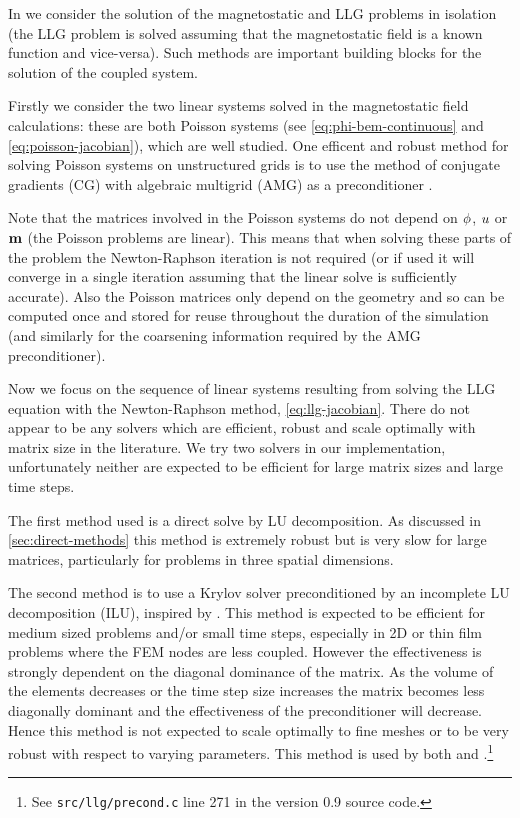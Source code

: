 In  we consider the solution of the magnetostatic and LLG problems in isolation (\ie the LLG problem is solved assuming that the magnetostatic field is a known function and vice-versa).
Such methods are important building blocks for the solution of the coupled system.

Firstly we consider the two linear systems solved in the magnetostatic field calculations: these are both Poisson systems (see \cref{eq:phi-bem-continuous} and \cref{eq:poisson-jacobian}), which are well studied.
One efficent and robust method for solving Poisson systems on unstructured grids is to use the method of conjugate gradients (CG) with algebraic multigrid (AMG) as a preconditioner \cite{Henson2002}.

Note that the matrices involved in the Poisson systems do not depend on $\phi$, $u$ or $\boldsymbol{\mathrm{m}}$ (\ie the Poisson problems are linear).
This means that when solving these parts of the problem the Newton-Raphson iteration is not required (or if used it will converge in a single iteration assuming that the linear solve is sufficiently accurate).
Also the Poisson matrices only depend on the geometry and so can be computed once and stored for reuse throughout the duration of the simulation (and similarly for the coarsening information required by the AMG preconditioner).


Now we focus on the sequence of linear systems resulting from solving the LLG equation with the Newton-Raphson method, \cref{eq:llg-jacobian}.
There do not appear to be any solvers which are efficient, robust and scale optimally with matrix size in the literature.
We try two solvers in our implementation, unfortunately neither are expected to be efficient for large matrix sizes and large time steps.

The first method used is a direct solve by LU decomposition.
As discussed in \cref{sec:direct-methods} this method is extremely robust but is very slow for large matrices, particularly for problems in three spatial dimensions.

The second method is to use a Krylov solver preconditioned by an incomplete LU decomposition (ILU), inspired by \cite{Suess2002}.
This method is expected to be efficient for medium sized problems and/or small time steps, especially in 2D or thin film problems where the FEM nodes are less coupled.
However the effectiveness is strongly dependent on the diagonal dominance of the matrix.
As the volume of the elements decreases or the time step size increases the matrix becomes less diagonally dominant and the effectiveness of the preconditioner will decrease.
Hence this method is not expected to scale optimally to fine meshes or to be very robust with respect to varying parameters.
This method is used by both \nmag \cite{fangor-in-viva} and \magpar.\footnote{See \texttt{src/llg/precond.c} line 271 in the \magpar version 0.9 source code.}

